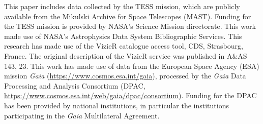 \documentclass[12pt,twocolumn,tighten]{aastex62}
\begin{document}

\acknowledgements
%
This paper includes data collected by the TESS mission, which are
publicly available from the Mikulski Archive for Space Telescopes
(MAST).
%
Funding for the TESS mission is provided by NASA's Science Mission
directorate.
%
This work made use of NASA's Astrophysics Data System Bibliographic
Services.
%
This research has made use of the VizieR catalogue access tool, CDS,
Strasbourg, France. The original description of the VizieR service was
published in A\&AS 143, 23.
%
This work has made use of data from the European Space Agency (ESA)
mission {\it Gaia} (\url{https://www.cosmos.esa.int/gaia}), processed
by the {\it Gaia} Data Processing and Analysis Consortium (DPAC,
\url{https://www.cosmos.esa.int/web/gaia/dpac/consortium}). Funding
for the DPAC has been provided by national institutions, in particular
the institutions participating in the {\it Gaia} Multilateral
Agreement.
%
\newline
%

                            
 
\end{document}
